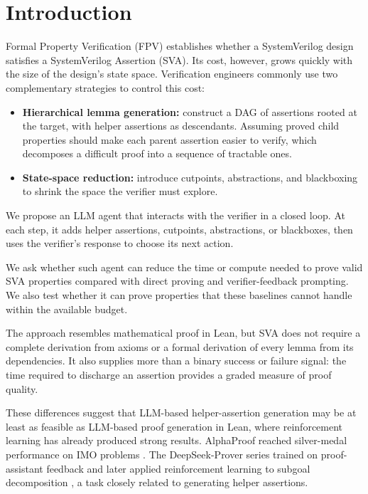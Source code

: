 \section{Introduction}

Formal Property Verification (FPV) establishes whether a SystemVerilog design satisfies a SystemVerilog Assertion (SVA). Its cost, however, grows quickly with the size of the design's state space. Verification engineers commonly use two complementary strategies to control this cost:

\begin{itemize}
    \item \textbf{Hierarchical lemma generation:} construct a DAG of assertions rooted at the target, with helper assertions as descendants. Assuming proved child properties should make each parent assertion easier to verify, which decomposes a difficult proof into a sequence of tractable ones.
    \item \textbf{State-space reduction:} introduce cutpoints, abstractions, and blackboxing to shrink the space the verifier must explore.
\end{itemize}

We propose an LLM agent that interacts with the verifier in a closed loop. At each step, it adds helper assertions, cutpoints, abstractions, or blackboxes, then uses the verifier's response to choose its next action.

We ask whether such agent can reduce the time or compute needed to prove valid SVA properties compared with direct proving and verifier-feedback prompting. We also test whether it can prove properties that these baselines cannot handle within the available budget.

The approach resembles mathematical proof in Lean, but SVA does not require a complete derivation from axioms or a formal derivation of every lemma from its dependencies. It also supplies more than a binary success or failure signal: the time required to discharge an assertion provides a graded measure of proof quality.

These differences suggest that LLM-based helper-assertion generation may be at least as feasible as LLM-based proof generation in Lean, where reinforcement learning has already produced strong results. AlphaProof reached silver-medal performance on IMO problems \cite{deepmind2024alphaproof}. The DeepSeek-Prover series trained on proof-assistant feedback \cite{xin2024deepseekproverv15} and later applied reinforcement learning to subgoal decomposition \cite{ren2025deepseekproverv2}, a task closely related to generating helper assertions.
